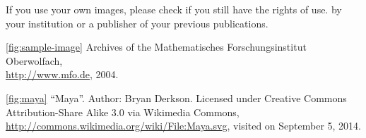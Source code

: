 \documentclass{snapshotmfo}
\begin{document}
If you use your own images, please check if you still have the rights of use.  by your institution or a publisher of your previous publications.

\clearpage

\begin{imagecredits}
  \item[\autoref{fig:sample-image}] Archives of the Mathematisches Forschungsinstitut Oberwolfach,\\\url{http://www.mfo.de}, 2004.
  \item[\autoref{fig:maya}] ``Maya''. Author: Bryan Derkson. Licensed under Creative Commons Attribution-Share Alike 3.0 via Wikimedia Commons, \url{http://commons.wikimedia.org/wiki/File:Maya.svg}, visited on September 5, 2014.
\end{imagecredits}


\end{document}
